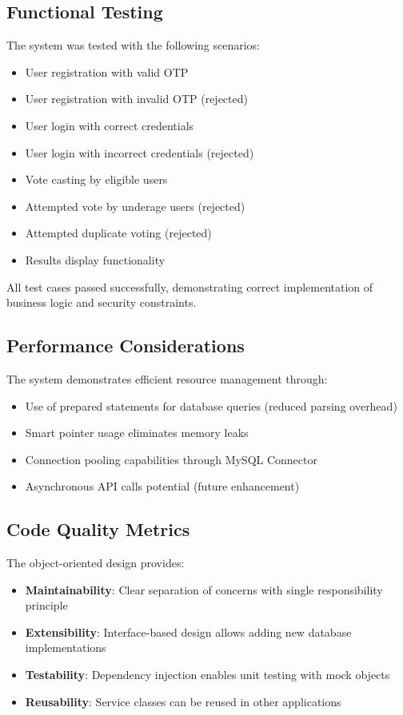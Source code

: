 \documentclass[conference]{IEEEtran}
\begin{document}
\subsection{Functional Testing}
The system was tested with the following scenarios:
\begin{itemize}
    \item User registration with valid OTP
    \item User registration with invalid OTP (rejected)
    \item User login with correct credentials
    \item User login with incorrect credentials (rejected)
    \item Vote casting by eligible users
    \item Attempted vote by underage users (rejected)
    \item Attempted duplicate voting (rejected)
    \item Results display functionality
\end{itemize}

All test cases passed successfully, demonstrating correct implementation of business logic and security constraints.

\subsection{Performance Considerations}
The system demonstrates efficient resource management through:
\begin{itemize}
    \item Use of prepared statements for database queries (reduced parsing overhead)
    \item Smart pointer usage eliminates memory leaks
    \item Connection pooling capabilities through MySQL Connector
    \item Asynchronous API calls potential (future enhancement)
\end{itemize}

\subsection{Code Quality Metrics}
The object-oriented design provides:
\begin{itemize}
    \item \textbf{Maintainability}: Clear separation of concerns with single responsibility principle
    \item \textbf{Extensibility}: Interface-based design allows adding new database implementations
    \item \textbf{Testability}: Dependency injection enables unit testing with mock objects
    \item \textbf{Reusability}: Service classes can be reused in other applications
\end{itemize}
\end{document}
